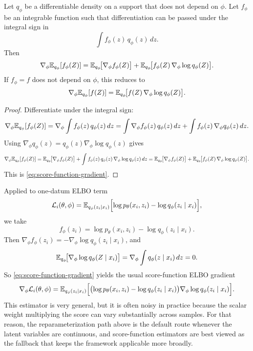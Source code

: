 \begin{proposition}
\label{prop:score-function-gradient}
Let \(q_\phi\) be a differentiable density on a support that does not depend on \(\phi\).
Let \(f_\phi\) be an integrable function such that differentiation can be passed under the integral sign in
\[
  \int f_\phi(z)\,q_\phi(z)\,dz.
\]
Then
\begin{equation}
  \nabla_\phi \mathbb{E}_{q_\phi}[f_\phi(Z)]
  =
  \mathbb{E}_{q_\phi}\!\bigl[\nabla_\phi f_\phi(Z)\bigr]
  +
  \mathbb{E}_{q_\phi}\!\bigl[f_\phi(Z)\,\nabla_\phi \log q_\phi(Z)\bigr].
  \label{eq:score-function-gradient}
\end{equation}
If \(f_\phi=f\) does not depend on \(\phi\), this reduces to
\[
  \nabla_\phi \mathbb{E}_{q_\phi}[f(Z)]
  =
  \mathbb{E}_{q_\phi}\!\bigl[f(Z)\,\nabla_\phi \log q_\phi(Z)\bigr].
\]
\end{proposition}
\begin{proof}
Differentiate under the integral sign:
\[
  \nabla_\phi \mathbb{E}_{q_\phi}[f_\phi(Z)]
  =
  \nabla_\phi \int f_\phi(z)\,q_\phi(z)\,dz
  =
  \int \nabla_\phi f_\phi(z)\,q_\phi(z)\,dz
  +
  \int f_\phi(z)\,\nabla_\phi q_\phi(z)\,dz.
\]
Using $\nabla_\phi q_\phi(z)=q_\phi(z)\nabla_\phi \log q_\phi(z)$ gives
\[
  \nabla_\phi \mathbb{E}_{q_\phi}[f_\phi(Z)]
  =
  \mathbb{E}_{q_\phi}\!\bigl[\nabla_\phi f_\phi(Z)\bigr]
  +
  \int f_\phi(z)\,q_\phi(z)\,\nabla_\phi \log q_\phi(z)\,dz
  =
  \mathbb{E}_{q_\phi}\!\bigl[\nabla_\phi f_\phi(Z)\bigr]
  +
  \mathbb{E}_{q_\phi}\!\bigl[f_\phi(Z)\,\nabla_\phi \log q_\phi(Z)\bigr].
\]
This is \eqref{eq:score-function-gradient}.%
\end{proof}

Applied to one-datum ELBO term
\[
  \mathcal{L}_i(\theta,\phi)
  =
  \mathbb{E}_{q_\phi(z_i\mid x_i)}
  \Bigl[
    \log p_\theta(x_i,z_i)-\log q_\phi(z_i\mid x_i)
  \Bigr],
\]
we take
\[
  f_\phi(z_i)
  =
  \log p_\theta(x_i,z_i)-\log q_\phi(z_i\mid x_i).
\]
Then \(\nabla_\phi f_\phi(z_i)=-\nabla_\phi\log q_\phi(z_i\mid x_i)\), and
\[
  \mathbb{E}_{q_\phi}\!\bigl[\nabla_\phi\log q_\phi(Z\mid x_i)\bigr]
  =
  \nabla_\phi \int q_\phi(z\mid x_i)\,dz
  =
  0.
\]
So \eqref{eq:score-function-gradient} yields the usual score-function ELBO gradient
\[
  \nabla_\phi \mathcal{L}_i(\theta,\phi)
  =
  \mathbb{E}_{q_\phi(z_i\mid x_i)}
  \Bigl[
    \bigl(\log p_\theta(x_i,z_i)-\log q_\phi(z_i\mid x_i)\bigr)
    \nabla_\phi \log q_\phi(z_i\mid x_i)
  \Bigr].
\]
This estimator is very general, but it is often noisy in practice because the scalar weight multiplying the score can vary substantially across samples.
For that reason, the reparameterization path above is the default route whenever the latent variables are continuous, and score-function estimators are best viewed as the fallback that keeps the framework applicable more broadly.

